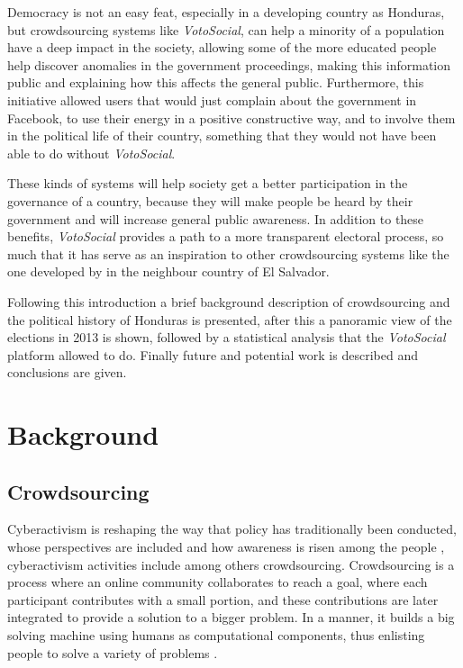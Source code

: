 \documentclass[letterpaper,10pt]{article}
\begin{document}
Democracy is not an easy feat, especially in a developing country as Honduras, but crowdsourcing systems like \textit{VotoSocial}, can help a minority of a population have a deep impact in the society, allowing some of the more educated people help discover anomalies in the government proceedings, making this information public and explaining how this affects the general public. Furthermore, this initiative allowed users that would just complain about the government in Facebook, to use their energy in a positive constructive way, and to involve them in the political life of their country, something that they would not have been able to do without \textit{VotoSocial}.

These kinds of systems will help society get a better participation in the governance of a country, because they will make people be heard by their government and will increase general public awareness. In addition to these benefits, \textit{VotoSocial} provides a path to a more transparent electoral process, so much that it has serve as an inspiration to other crowdsourcing systems like the one developed by \citep{contemosnosotros} in the neighbour country of El Salvador. 

Following this introduction a brief background description of crowdsourcing and the political history of Honduras is presented, after this a panoramic view of the elections in 2013 is shown, followed by a statistical analysis that the \textit{VotoSocial} platform allowed to do. Finally future and potential work is described and conclusions are given.


\section{Background}

\subsection{Crowdsourcing}

Cyberactivism is reshaping the way that policy has traditionally been conducted, whose perspectives are included and how awareness is risen among the people \citep{milan2013}, cyberactivism activities include among others crowdsourcing. Crowdsourcing is a process where an online community collaborates to reach a goal, where each participant contributes with a small portion, and these contributions are later integrated to provide a solution to a bigger problem. In a manner, it builds a big solving machine using humans as computational components, thus enlisting people to solve a variety of problems \citep{doan2011}.
\end{document}
